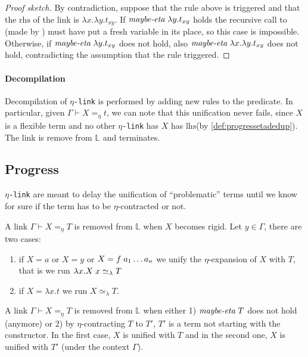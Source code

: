 \documentclass[sigconf,natbib=false,review]{acmart}
\newcommand{\appsep}{\ensuremath{\textcolor{lightgray}{\cdot}}}
\newcommand{\UnifRel}{\ensuremath{\simeq}}
\newcommand{\Ue}{\ensuremath{\UnifRel_\lambda}\xspace}
\newcommand{\linkMacro}[1]{\ensuremath{#1}\texttt{-link}\xspace}
\newcommand{\linketa} {\linkMacro{\eta}}
\newcommand{\linketaM}[3]{\ensuremath{#1 \vdash #2 =_\eta #3}}
\newcommand{\lhs}{\ensuremath{\mathrm{lhs}}\xspace}
\newcommand{\rhs}{\ensuremath{\mathrm{rhs}}\xspace}
\newcommand{\linkStore}{\ensuremath{\mathbb{L}}\xspace}
\begin{document}
\begin{proof}[Proof sketch]
  By contradiction, suppose that the rule above is triggered and that
  the \rhs of the link is $\lambda x.\lambda y.t_{xy}$.
  If $\emph{maybe-eta}{}~\lambda y.t_{xy}$ holds the recursive call to
   (made by ) must have put a fresh variable
  in its place, so this case is impossible.
  Otherwise, if $\emph{maybe-eta}{}~\lambda y.t_{xy}$ does not hold, also
  $\emph{maybe-eta}{}~\lambda x.\lambda y.t_{xy}$ does not hold, contradicting
  the assumption that the rule triggered.
\end{proof}

\paragraph{Decompilation}
Decompilation of \linketa is performed by adding new rules to the
 predicate. In particular, given \linketaM{\Gamma}{X}{t}, we
can note that this unification never fails, since $X$ is a flexible term and no
other \linketa has $X$ has \lhs (by \cref{def:progressetadedup}). The link is
remove from \linkStore and  terminates.

\subsection{Progress}\label{sec:etaprogress}

\linketa are meant to delay the unification of ``problematic'' terms until
we know for sure if the term has to be $\eta$-contracted or not.

\newcommand{\progressetaleft}{\emph{progress-$\eta$-left}\xspace}
\begin{definition}[\progressetaleft]\label{def:progressetaleft}
A link \linketaM{\Gamma}{X}{T} is removed from \linkStore when
$X$ becomes rigid. Let $y\in\Gamma$, there are two cases:
\begin{enumerate}
  \item if $X = a$ or $X = y$ or $X = f \appsep a_1\ldots a_n$
    we unify the $\eta$-expansion of $X$ with $T$, that is we run
    $\lambda x.X \appsep x\Ue{} T$
    \item if $X = \lambda x.t$ we run $X \Ue{} T$.
\end{enumerate}
\end{definition}

\newcommand{\progressetaright}{\emph{progress-$\eta$-right}\xspace}
\begin{definition}[\progressetaright]\label{def:progressetaright} A link
\linketaM{\Gamma}{X}{T} is removed from \linkStore when either 1)
$\emph{maybe-eta}~T$ does not hold (anymore) or 2) by $\eta$-contracting $T$ to
$T'$, $T'$ is a term not starting with the  constructor. In the
first case, $X$ is unified with $T$ and in the second one, $X$ is unified with
$T'$ (under the context $\Gamma$).
\end{definition}
\end{document}
